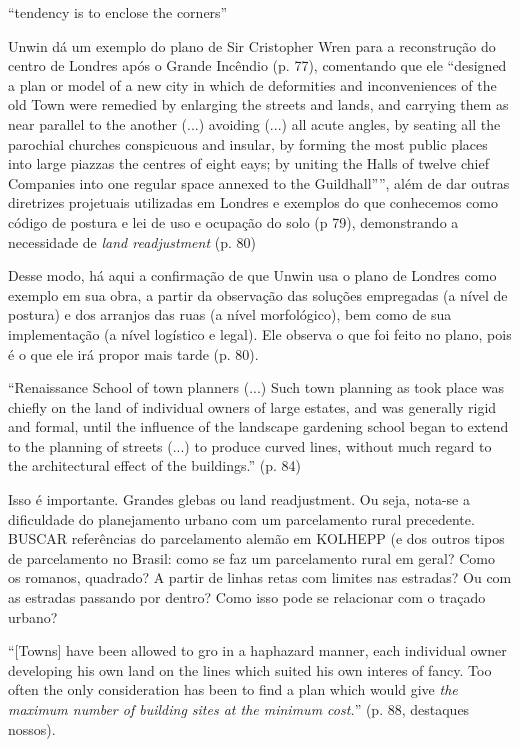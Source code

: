 \documentclass[12pt, a4paper]{book} %
\begin{document}
        ``tendency is to enclose the corners''

        Unwin dá um exemplo do plano de Sir Cristopher Wren para a reconstrução do centro de Londres após o Grande Incêndio (p. 77), comentando que ele ``designed a plan or model of a new city in which de deformities and inconveniences of the old Town were remedied by enlarging the streets and lands, and carrying them as near parallel to the another (...) avoiding (...) all acute angles, by seating all the parochial churches conspicuous and insular, by forming the most public places into large piazzas the centres of eight eays; by uniting the Halls of twelve chief Companies into one regular space annexed to the Guildhall'''', além de dar outras diretrizes projetuais utilizadas em Londres e exemplos do que conhecemos como código de postura e lei de uso e ocupação do solo (p 79), demonstrando a necessidade de \textit{land readjustment} (p. 80)

        Desse modo, há aqui a confirmação de que Unwin usa o plano de Londres como exemplo em sua obra, a partir da observação das soluções empregadas (a nível de postura) e dos arranjos das ruas (a nível morfológico), bem como de sua implementação (a nível logístico e legal). Ele observa o que foi feito no plano, pois é o que ele irá propor mais tarde (p. 80).

        ``Renaissance School of town planners (...) Such town planning as took place was chiefly on the land of individual owners of large estates, and was generally rigid and formal, until the influence of the landscape gardening school began to extend to the planning of streets (...) to produce curved lines, without much regard to the architectural effect of the buildings.'' (p. 84)

        Isso é importante.  Grandes glebas ou land readjustment. Ou seja, nota-se a dificuldade do planejamento urbano com um parcelamento rural precedente.  BUSCAR referências do parcelamento alemão em KOLHEPP (e dos outros tipos de parcelamento no Brasil: como se faz um parcelamento rural em geral? Como os romanos, quadrado? A partir de linhas retas com limites nas estradas? Ou com as estradas passando por dentro? Como isso pode se relacionar com o traçado urbano?

        ``[Towns] have been allowed to gro in a haphazard manner, each individual owner developing his own land on the lines which suited his own interes of fancy. Too often the only consideration has been to find a plan which would give \textit{the maximum number of building sites at the minimum cost.}'' (p. 88, destaques nossos).
\end{document}
